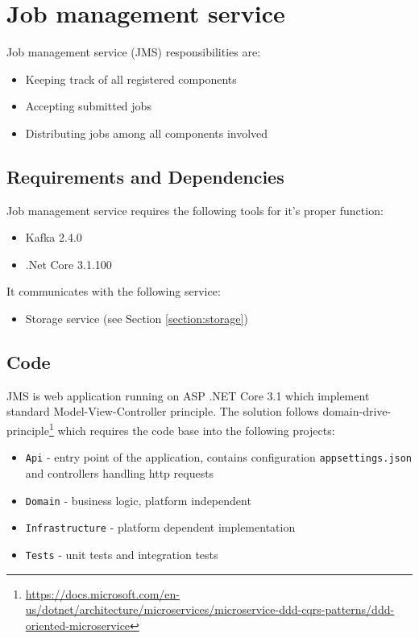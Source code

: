 \section{Job management service}\label{section:jms}

Job management service (JMS) responsibilities are:

\begin{itemize}
\item Keeping track of all registered components
\item Accepting submitted jobs
\item Distributing jobs among all components involved
\end{itemize}

\subsection{Requirements and Dependencies}

Job management service requires the following tools for it's proper function:

\begin{itemize}
    \item Kafka 2.4.0
    \item .Net Core 3.1.100
\end{itemize}

It communicates with the following service:
\begin{itemize}
    \item Storage service (see Section \ref{section:storage})
\end{itemize}

\subsection{Code}

JMS is web application running on ASP .NET Core 3.1 which implement standard Model-View-Controller principle. The solution follows domain-drive-principle\footnote{\url{https://docs.microsoft.com/en-us/dotnet/architecture/microservices/microservice-ddd-cqrs-patterns/ddd-oriented-microservice}} which requires  the code base into the following projects: 
\begin{itemize}
    \item \texttt{Api} - entry point of the application, contains configuration \texttt{appsettings.json} and controllers handling http requests
    \item \texttt{Domain} - business logic, platform independent
    \item \texttt{Infrastructure} - platform dependent implementation
    \item \texttt{Tests} - unit tests and integration tests
\end{itemize}

